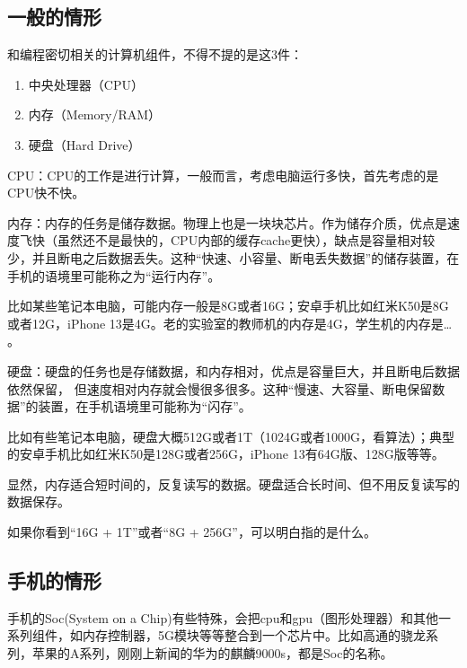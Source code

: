 \documentclass[
  letterpaper,
  DIV=11,
  numbers=noendperiod]{scrreprt}
\providecommand{\tightlist}{%
  \setlength{\itemsep}{0pt}\setlength{\parskip}{0pt}}\usepackage{longtable,booktabs,array}
\begin{document}

\hypertarget{ux4e00ux822cux7684ux60c5ux5f62}{%
\subsection*{一般的情形}\label{ux4e00ux822cux7684ux60c5ux5f62}}

和编程密切相关的计算机组件，不得不提的是这3件：

\begin{enumerate}
\def\labelenumi{\arabic{enumi}.}
\tightlist
\item
  中央处理器（CPU）
\item
  内存（Memory/RAM）
\item
  硬盘（Hard Drive）
\end{enumerate}

CPU：CPU的工作是进行计算，一般而言，考虑电脑运行多快，首先考虑的是CPU快不快。

内存：内存的任务是储存数据。物理上也是一块块芯片。作为储存介质，优点是速度飞快（虽然还不是最快的，CPU内部的缓存cache更快），缺点是容量相对较少，并且断电之后数据丢失。这种``快速、小容量、断电丢失数据''的储存装置，在手机的语境里可能称之为``运行内存''。

比如某些笔记本电脑，可能内存一般是8G或者16G；安卓手机比如红米K50是8G或者12G，iPhone
13是4G。老的实验室的教师机的内存是4G，学生机的内存是\ldots{} 。

硬盘：硬盘的任务也是存储数据，和内存相对，优点是容量巨大，并且断电后数据依然保留，
但速度相对内存就会慢很多很多。这种``慢速、大容量、断电保留数据''的装置，在手机语境里可能称为``闪存''。

比如有些笔记本电脑，硬盘大概512G或者1T（1024G或者1000G，看算法）；典型的安卓手机比如红米K50是128G或者256G，iPhone
13有64G版、128G版等等。

显然，内存适合短时间的，反复读写的数据。硬盘适合长时间、但不用反复读写的数据保存。

如果你看到``16G + 1T''或者``8G + 256G''，可以明白指的是什么。

\hypertarget{ux624bux673aux7684ux60c5ux5f62}{%
\subsection*{手机的情形}\label{ux624bux673aux7684ux60c5ux5f62}}

手机的Soc(System on a
Chip)有些特殊，会把cpu和gpu（图形处理器）和其他一系列组件，如内存控制器，5G模块等等整合到一个芯片中。比如高通的骁龙系列，苹果的A系列，刚刚上新闻的华为的麒麟9000s，都是Soc的名称。
\end{document}
